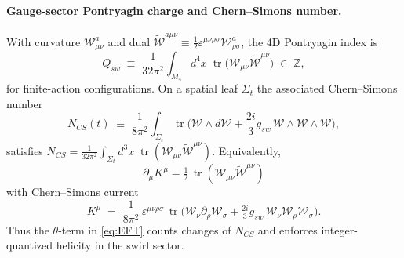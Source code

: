 \documentclass[smallextended]{svjour3}       %
\begin{document}
	\paragraph{Gauge-sector Pontryagin charge and Chern--Simons number.}
	With curvature \(\mathcal{W}_{\mu\nu}^a\) and dual \(\tilde{\mathcal{W}}^{a\mu\nu} \equiv \tfrac12 \varepsilon^{\mu\nu\rho\sigma}\mathcal{W}^a_{\rho\sigma}\),
	the 4D Pontryagin index is
	\begin{equation}
		Q_{\!sw} \;\equiv\; \frac{1}{32\pi^2} \int_{M_4} \! d^4x\; \mathop{\mathrm{tr}}\!\big(\mathcal{W}_{\mu\nu}\tilde{\mathcal{W}}^{\mu\nu}\big) \;\in\; \mathbb{Z},
		\label{eq:Qsw}
	\end{equation}
	for finite-action configurations. On a spatial leaf \(\Sigma_t\) the associated Chern--Simons number
	\begin{equation}
		N_{\!CS}(t) \;\equiv\; \frac{1}{8\pi^2} \int_{\Sigma_t} \mathop{\mathrm{tr}}\!\Big(\mathcal{W}\wedge d\mathcal{W} + \frac{2i}{3} g_{\!sw}\,\mathcal{W}\wedge\mathcal{W}\wedge\mathcal{W}\Big),
	\end{equation}
	satisfies \(\dot N_{\!CS}=\tfrac{1}{32\pi^2}\!\int_{\Sigma_t}\! d^3x\;\mathop{\mathrm{tr}}(\mathcal{W}_{\mu\nu}\tilde{\mathcal{W}}^{\mu\nu})\).
	Equivalently,
	\[\partial_\mu K^\mu=\tfrac12\,\mathop{\mathrm{tr}}(\mathcal{W}_{\mu\nu}\tilde{\mathcal{W}}^{\mu\nu})\]
	with Chern--Simons current
	\begin{equation}
		K^\mu \;=\; \frac{1}{8\pi^2}\,\varepsilon^{\mu\nu\rho\sigma}\,\mathop{\mathrm{tr}}\!\Big(\mathcal{W}_\nu\partial_\rho\mathcal{W}_\sigma + \tfrac{2i}{3} g_{\!sw}\,\mathcal{W}_\nu\mathcal{W}_\rho\mathcal{W}_\sigma\Big).
	\end{equation}
	Thus the \(\theta\)-term in \eqref{eq:EFT} counts changes of \(N_{\!CS}\) and enforces integer-quantized helicity in the swirl sector.
\end{document}
